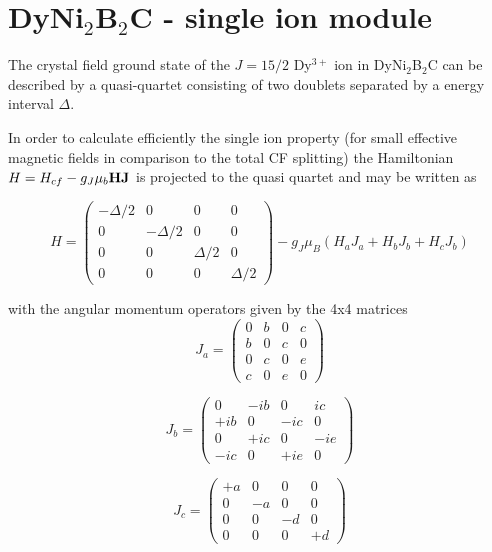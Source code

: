 \newpage
\section{DyNi$_2$B$_2$C - single ion module}\label{dyni2b2c}

The crystal field ground state of the $J=15/2$ Dy$^{3+}$ ion in DyNi$_2$B$_2$C 
can be   described by a quasi-quartet consisting of two doublets separated
by a energy interval $\Delta$.

In order to calculate efficiently the single ion property (for small effective
magnetic fields in comparison to the total CF splitting) the 
Hamiltonian $H=H_{cf}- g_J \mu_b {\mathbf H}{\mathbf J}$ is projected to the quasi quartet
and may be written as

\begin{equation}\label{ham}
H=\left (
\begin{array}{cccc}
-\Delta/2 & 0 & 0 & 0 \\
0 & -\Delta/2 & 0 & 0 \\
0 & 0 & \Delta/2  & 0 \\
0 & 0 & 0 & \Delta/2 
\end{array}
\right)
 -g_J \mu_B (H_a J_a + H_b J_b + H_c J_b)
\end{equation}

with the angular momentum operators given by the  4x4 matrices
\begin{equation}
J_a=
\left (
\begin{array}{cccc}
0 & b & 0 & c \\
b & 0 & c & 0 \\
0 & c & 0 & e \\
c & 0 & e & 0 
\end{array}
\right )
\end{equation}

\begin{equation}
J_b=
\left (
\begin{array}{cccc}
0 & -ib & 0 & ic \\
+ib & 0 & -ic & 0 \\
0 & +ic & 0 & -ie \\
-ic & 0 & +ie & 0 
\end{array}
\right )
\end{equation}


\begin{equation}
J_c=
\left (
\begin{array}{cccc}
+a& 0 & 0 & 0 \\
0 &-a & 0 & 0 \\
0 & 0 &-d & 0 \\
0 & 0 & 0 &+d 
\end{array}
\right )
\end{equation}

